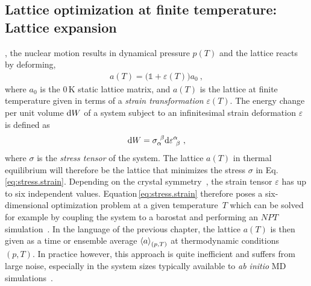 \subsection{Lattice optimization at finite temperature: Lattice expansion}
,
the nuclear motion results in dynamical pressure $p(T)$ and the lattice reacts by deforming,
\begin{align}
a (T) = \bm ( \mathds 1 + \varepsilon (T) \bm ) a_0~,
\label{eq:lattice.T}
\end{align}
where $a_0$ is the 0\,K static lattice matrix, and $a (T)$ is the lattice at finite temperature given in terms of a \emph{strain transformation} $\varepsilon (T)$. 
The energy change per unit volume ${\rm d} W$ of a system subject to an infinitesimal strain deformation $\varepsilon$ is defined as
\begin{align}
\d W = \sigma_{\alpha}^{~\beta} \d \varepsilon^{\alpha}_{~\beta}~,
\label{eq:stress.strain}
\end{align}
where $\sigma$ is the \emph{stress tensor} of the system. The lattice $a(T)$ in thermal equilibrium will therefore be the lattice that minimizes the stress $\sigma$ in Eq.\,\eqref{eq:stress.strain}. Depending on the crystal symmetry~\cite{Nye1985}, the strain tensor $\varepsilon$ has up to six independent values. Equation\,\eqref{eq:stress.strain} therefore poses a six-dimensional optimization problem at a given temperature~$T$ which can be solved for example by coupling the system to a barostat and performing an $NPT$ simulation~. In the language of the previous chapter, the lattice $a(T)$ is then given as a time or ensemble average $\braket{a}_{(p, T)}$ at thermodynamic conditions $(p, T)$. In practice however, this approach is quite inefficient and suffers from large noise, especially in the system sizes typically available to \emph{ab initio} MD simulations~.

